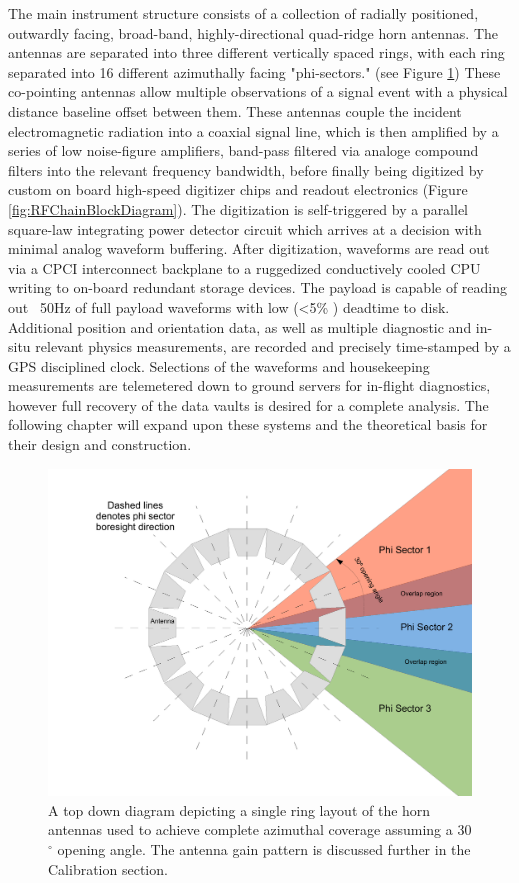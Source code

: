 	The main instrument structure consists of a collection of radially positioned, outwardly facing, broad-band, highly-directional quad-ridge horn antennas.  The antennas are separated into three different vertically spaced rings, with each ring separated into 16 different azimuthally facing "phi-sectors." (see Figure \ref{fig:phiSectors})  These co-pointing antennas allow multiple observations of a signal event with a physical distance baseline offset between them. These antennas couple the incident electromagnetic radiation into a coaxial signal line, which is then amplified by a series of low noise-figure amplifiers, band-pass filtered via analoge compound filters into the relevant frequency bandwidth, before finally being digitized by custom on board high-speed digitizer chips and readout electronics (Figure \ref{fig:RFChainBlockDiagram}).  The digitization is self-triggered by a parallel square-law integrating power detector circuit which arrives at a decision with minimal analog waveform buffering.  After digitization, waveforms are read out via a CPCI interconnect backplane to a ruggedized conductively cooled CPU writing to on-board redundant storage devices.  The payload is capable of reading out ~50Hz of full payload waveforms with low (\textless 5\% ) deadtime to disk.  Additional position and orientation data, as well as multiple diagnostic and in-situ relevant physics measurements, are recorded and precisely time-stamped by a GPS disciplined clock.  Selections of the waveforms and housekeeping measurements are telemetered down to ground servers for in-flight diagnostics, however full recovery of the data vaults is desired for a complete analysis.  The following chapter will expand upon these systems and the theoretical basis for their design and construction.
	
	
	
\begin{figure}
\centering
	\includegraphics[width=\textwidth]{figures/phiSectors} 
	\caption{A top down diagram depicting a single ring layout of the horn antennas used to achieve complete azimuthal coverage assuming a 30$^{\circ}$  opening angle.  The antenna gain pattern is discussed further in the Calibration section.}
	\label{fig:phiSectors}
\end{figure}


